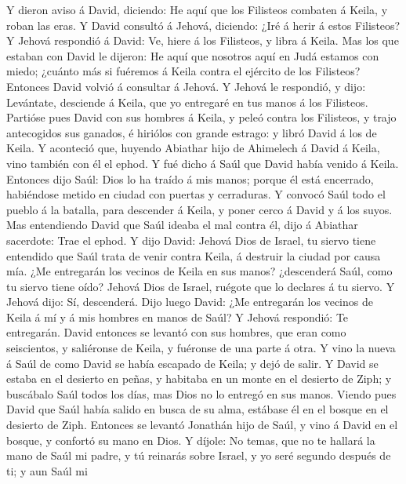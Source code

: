  Y dieron aviso á David, diciendo: He aquí que los
Filisteos combaten á Keila, y roban las eras.  Y David
consultó á Jehová, diciendo: ¿Iré á herir á estos Filisteos? Y Jehová
respondió á David: Ve, hiere á los Filisteos, y libra á Keila.
 Mas los que estaban con David le dijeron: He aquí que
nosotros aquí en Judá estamos con miedo; ¿cuánto más si fuéremos á Keila
contra el ejército de los Filisteos?  Entonces David
volvió á consultar á Jehová. Y Jehová le respondió, y dijo: Levántate,
desciende á Keila, que yo entregaré en tus manos á los Filisteos.
 Partióse pues David con sus hombres á Keila, y peleó
contra los Filisteos, y trajo antecogidos sus ganados, é hiriólos con
grande estrago: y libró David á los de Keila.  Y aconteció
que, huyendo Abiathar hijo de Ahimelech á David á Keila, vino también
con él el ephod.  Y fué dicho á Saúl que David había
venido á Keila. Entonces dijo Saúl: Dios lo ha traído á mis manos;
porque él está encerrado, habiéndose metido en ciudad con puertas y
cerraduras.  Y convocó Saúl todo el pueblo á la batalla,
para descender á Keila, y poner cerco á David y á los suyos.
 Mas entendiendo David que Saúl ideaba el mal contra él,
dijo á Abiathar sacerdote: Trae el ephod.  Y dijo David:
Jehová Dios de Israel, tu siervo tiene entendido que Saúl trata de venir
contra Keila, á destruir la ciudad por causa mía.  ¿Me
entregarán los vecinos de Keila en sus manos? ¿descenderá Saúl, como tu
siervo tiene oído? Jehová Dios de Israel, ruégote que lo declares á tu
siervo. Y Jehová dijo: Sí, descenderá.  Dijo luego David:
¿Me entregarán los vecinos de Keila á mí y á mis hombres en manos de
Saúl? Y Jehová respondió: Te entregarán.  David entonces
se levantó con sus hombres, que eran como seiscientos, y saliéronse de
Keila, y fuéronse de una parte á otra. Y vino la nueva á Saúl de como
David se había escapado de Keila; y dejó de salir.  Y
David se estaba en el desierto en peñas, y habitaba en un monte en el
desierto de Ziph; y buscábalo Saúl todos los días, mas Dios no lo
entregó en sus manos.  Viendo pues David que Saúl había
salido en busca de su alma, estábase él en el bosque en el desierto de
Ziph.  Entonces se levantó Jonathán hijo de Saúl, y vino
á David en el bosque, y confortó su mano en Dios.  Y
díjole: No temas, que no te hallará la mano de Saúl mi padre, y tú
reinarás sobre Israel, y yo seré segundo después de ti; y aun Saúl mi
